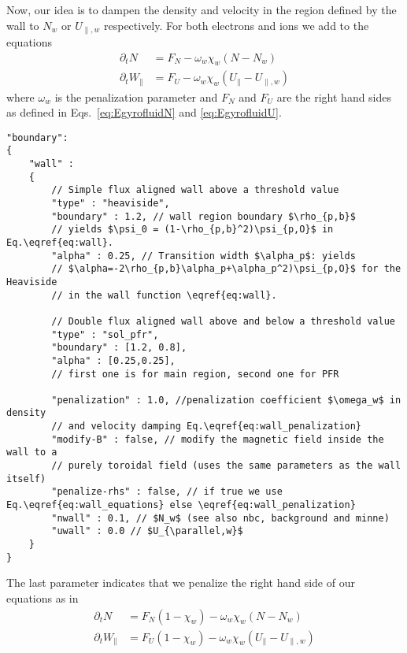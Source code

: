 Now, our idea is to dampen the density and velocity in the region defined by the
wall to $N_w$ or $U_{\parallel,w}$ respectively.
For both electrons and ions we add to the equations
\begin{subequations} \label{eq:wall_penalization}
\begin{align}
    \partial_t N &= F_N -\omega_w\chi_w (N-N_w)\\
    \partial_t W_\parallel &= F_U -\omega_w\chi_w (U_\parallel-U_{\parallel,w})
\end{align}
\end{subequations}
where $\omega_w$ is the penalization parameter and $F_N$ and $F_U$ are the
right hand sides as defined in Eqs.~\eqref{eq:EgyrofluidN} and \eqref{eq:EgyrofluidU}.
\begin{verbatim}
"boundary":
{
    "wall" :
    {
        // Simple flux aligned wall above a threshold value
        "type" : "heaviside",
        "boundary" : 1.2, // wall region boundary $\rho_{p,b}$
        // yields $\psi_0 = (1-\rho_{p,b}^2)\psi_{p,O}$ in Eq.\eqref{eq:wall}.
        "alpha" : 0.25, // Transition width $\alpha_p$: yields
        // $\alpha=-2\rho_{p,b}\alpha_p+\alpha_p^2)\psi_{p,O}$ for the Heaviside
        // in the wall function \eqref{eq:wall}.

        // Double flux aligned wall above and below a threshold value
        "type" : "sol_pfr",
        "boundary" : [1.2, 0.8],
        "alpha" : [0.25,0.25],
        // first one is for main region, second one for PFR

        "penalization" : 1.0, //penalization coefficient $\omega_w$ in density
        // and velocity damping Eq.\eqref{eq:wall_penalization}
        "modify-B" : false, // modify the magnetic field inside the wall to a
        // purely toroidal field (uses the same parameters as the wall itself)
        "penalize-rhs" : false, // if true we use Eq.\eqref{eq:wall_equations} else \eqref{eq:wall_penalization}
        "nwall" : 0.1, // $N_w$ (see also nbc, background and minne)
        "uwall" : 0.0 // $U_{\parallel,w}$
    }
}
\end{verbatim}
\noindent
The last parameter indicates that we penalize the right hand side of our equations
as in
\begin{subequations} \label{eq:wall_equations}
\begin{align}
    \partial_t N &= F_N ( 1-\chi_w) -\omega_w\chi_w (N-N_w)\\
\partial_t W_\parallel &= F_U ( 1 - \chi_w) -\omega_w\chi_w (U_\parallel-U_{\parallel,w})
\end{align}
\end{subequations}

